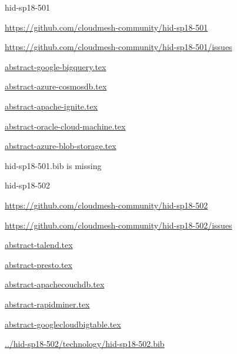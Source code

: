 \begin{IU}

hid-sp18-501

\url{https://github.com/cloudmesh-community/hid-sp18-501}

\url{https://github.com/cloudmesh-community/hid-sp18-501/issues}

\href{https://github.com/cloudmesh-community/hid-sp18-501/blob/master//technology/abstract-google-bigquery.tex}{abstract-google-bigquery.tex}

\href{https://github.com/cloudmesh-community/hid-sp18-501/blob/master//technology/abstract-azure-cosmosdb.tex}{abstract-azure-cosmosdb.tex}

\href{https://github.com/cloudmesh-community/hid-sp18-501/blob/master//technology/abstract-apache-ignite.tex}{abstract-apache-ignite.tex}

\href{https://github.com/cloudmesh-community/hid-sp18-501/blob/master//technology/abstract-oracle-cloud-machine.tex}{abstract-oracle-cloud-machine.tex}

\href{https://github.com/cloudmesh-community/hid-sp18-501/blob/master//technology/abstract-azure-blob-storage.tex}{abstract-azure-blob-storage.tex}

hid-sp18-501.bib is missing

\end{IU}


\begin{IU}

hid-sp18-502

\url{https://github.com/cloudmesh-community/hid-sp18-502}

\url{https://github.com/cloudmesh-community/hid-sp18-502/issues}

\href{https://github.com/cloudmesh-community/hid-sp18-502/blob/master//technology/abstract-talend.tex}{abstract-talend.tex}

\href{https://github.com/cloudmesh-community/hid-sp18-502/blob/master//technology/abstract-presto.tex}{abstract-presto.tex}

\href{https://github.com/cloudmesh-community/hid-sp18-502/blob/master//technology/abstract-apachecouchdb.tex}{abstract-apachecouchdb.tex}

\href{https://github.com/cloudmesh-community/hid-sp18-502/blob/master//technology/abstract-rapidminer.tex}{abstract-rapidminer.tex}

\href{https://github.com/cloudmesh-community/hid-sp18-502/blob/master//technology/abstract-googlecloudbigtable.tex}{abstract-googlecloudbigtable.tex}

\href{https://github.com/cloudmesh-community/hid-sp18-502/blob/master//technology/hid-sp18-502.bib}{../hid-sp18-502/technology/hid-sp18-502.bib}

\end{IU}



